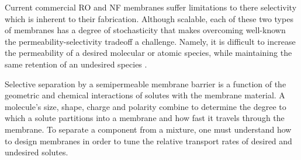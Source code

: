 \documentclass[journal=jpcbfk,manusciprt=article]{achemso}
\begin{document}
  Current commercial RO and NF membranes suffer limitations to there selectivity 
  which is inherent to their fabrication. Although scalable, each of these two types
  of membranes has a degree of stochasticity that makes overcoming well-known the 
  permeability-selectivity tradeoff a challenge. Namely, it is difficult to increase
  the permeability of a desired molecular or atomic species, while maintaining the same 
  retention of an undesired species \cite{werber_materials_2016}. 


  Selective separation by a semipermeable membrane barrier is a function of the
  geometric and chemical interactions of solutes with the membrane material. A
  molecule's size, shape, charge and polarity combine to determine the degree to
  which a solute partitions into a membrane and how fast it travels through the
  membrane. To separate a component from a mixture, one must understand how to
  design membranes in order to tune the relative transport rates of desired and
  undesired solutes\cite{gin_polymerized_2008,wijmans_solution-diffusion_1995}. 

\end{document}
